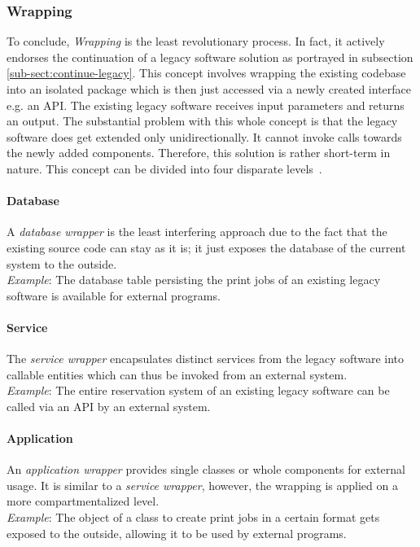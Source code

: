\documentclass[12pt,a4paper]{report}
\begin{document}
\subsubsection{Wrapping}

To conclude, \textit{Wrapping} is the least revolutionary process.
In fact, it actively endorses the continuation of a legacy software solution as
portrayed in subsection \ref{sub-sect:continue-legacy}.
This concept involves wrapping the existing codebase into an isolated package
which is then just accessed via a newly created interface e.g. an API.
The existing legacy software receives input parameters and returns an output.
The substantial problem with this whole concept is that the legacy software does get
extended only unidirectionally. It cannot invoke calls towards the newly added components.
Therefore, this solution is rather short-term in nature.
This concept can be divided into four disparate levels~\cite{sneed-encapsulating-legacy}.

\paragraph{Database}
A \textit{database wrapper} is the least interfering approach due to the fact that
the existing source code can stay as it is; it just exposes the database of the current system
to the outside.\\
\textit{Example}: The database table persisting the print jobs of an existing legacy software
is available for external programs.

\paragraph{Service}
The \textit{service wrapper} encapsulates distinct services from the legacy software
into callable entities which can thus be invoked from an external system.\\
\textit{Example}: The entire reservation system of an existing legacy software
can be called via an API by an external system.

\paragraph{Application}
An \textit{application wrapper} provides single classes or whole components for external usage.
It is similar to a \textit{service wrapper}, however, the wrapping is applied on a more
compartmentalized level.\\
\textit{Example}: The object of a class to create print jobs in a certain format
gets exposed to the outside, allowing it to be used by external programs.
\end{document}
